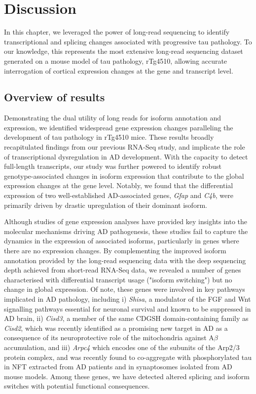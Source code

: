 \clearpage
\section{Discussion}

In this chapter, we leveraged the power of long-read sequencing to identify transcriptional and splicing changes associated with progressive tau pathology. To our knowledge, this represents the most extensive long-read sequencing dataset generated on a mouse model of tau pathology, rTg4510, allowing accurate interrogation of cortical expression changes at the gene and transcript level. 

\subsection{Overview of results}
Demonstrating the dual utility of long reads for isoform annotation and expression, we identified widespread gene expression changes paralleling the development of tau pathology in rTg4510 mice. These results broadly recapitulated findings from our previous RNA-Seq study\cite{Castanho2020}, and implicate the role of transcriptional dysregulation in AD development. With the capacity to detect full-length transcripts, our study was further powered to identify robust genotype-associated changes in isoform expression that contribute to the global expression changes at the gene level. Notably, we found that the differential expression of two well-established AD-associated genes, \textit{Gfap} and \textit{C4b}, were primarily driven by drastic upregulation of their dominant isoform. 

Although studies of gene expression analyses have provided key insights into the molecular mechanisms driving AD pathogenesis\cite{Castanho2020,Salih2019,Annese2018,Magistri2015}, these studies fail to capture the dynamics in the expression of associated isoforms, particularly in genes where there are no expression changes. By complementing the improved isoform annotation provided by the long-read sequencing data with the deep sequencing depth achieved from short-read RNA-Seq data, we revealed a number of genes characterised with differential transcript usage ("isoform switching") but no change in global expression. Of note, these genes were involved in key pathways implicated in AD pathology, including i) \textit{Shisa}, a modulator of the FGF and Wnt signalling pathways essential for neuronal survival and known to be suppressed in AD brain\cite{Jia2019}, ii) \textit{Cisd3}, a member of the same CDGSH domain-containing family as \textit{Cisd2}, which was recently identified as a promising new target in AD as a consequence of its neuroprotective role of the mitochondria against A$\beta$ accumulation\cite{Chen2020}, and iii) \textit{Arpc4} which encodes one of the subunits of the Arp2/3 protein complex, and was recently found to co-aggregate with phosphorylated tau in NFT extracted from AD patients\cite{Drummond2020} and in synaptosomes isolated from AD mouse models\cite{Li2020a}. Among these genes, we have detected altered splicing and isoform switches with potential functional consequences.  
  

